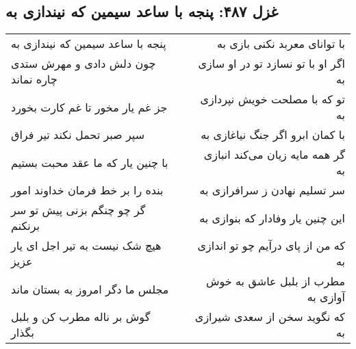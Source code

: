 \begin{center}
\section*{غزل ۴۸۷: پنجه با ساعد سیمین که نیندازی به}
\label{sec:487}
\begin{longtable}{l p{0.5cm} r}
پنجه با ساعد سیمین که نیندازی به
&&
با توانای معربد نکنی بازی به
\\
چون دلش دادی و مهرش ستدی چاره نماند
&&
اگر او با تو نسازد تو در او سازی به
\\
جز غم یار مخور تا غم کارت بخورد
&&
تو که با مصلحت خویش نپردازی به
\\
سپر صبر تحمل نکند تیر فراق
&&
با کمان ابرو اگر جنگ نیاغازی به
\\
با چنین یار که ما عقد محبت بستیم
&&
گر همه مایه زیان می‌کند انبازی به
\\
بنده را بر خط فرمان خداوند امور
&&
سر تسلیم نهادن ز سرافرازی به
\\
گر چو چنگم بزنی پیش تو سر برنکنم
&&
این چنین یار وفادار که بنوازی به
\\
هیچ شک نیست به تیر اجل ای یار عزیز
&&
که من از پای درآیم چو تو اندازی به
\\
مجلس ما دگر امروز به بستان ماند
&&
مطرب از بلبل عاشق به خوش آوازی به
\\
گوش بر ناله مطرب کن و بلبل بگذار
&&
که نگوید سخن از سعدی شیرازی به
\\
\end{longtable}
\end{center}
